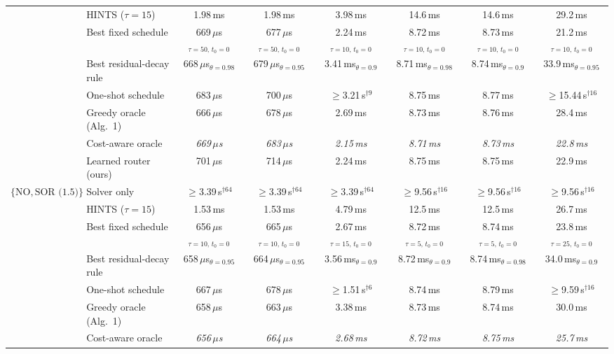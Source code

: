 {\begin{tabular}{llcccccc}
 & HINTS ($\tau{=}15$) & 1.98\,ms & 1.98\,ms & 3.98\,ms & 14.6\,ms & 14.6\,ms & 29.2\,ms \\
 & Best fixed schedule & 669\,$\mu$s$_{\tau{=}50,\,t_0{=}0}$ & 677\,$\mu$s$_{\tau{=}50,\,t_0{=}0}$ & 2.24\,ms$_{\tau{=}10,\,t_0{=}0}$ & 8.72\,ms$_{\tau{=}10,\,t_0{=}0}$ & 8.73\,ms$_{\tau{=}10,\,t_0{=}0}$ & 21.2\,ms$_{\tau{=}10,\,t_0{=}0}$ \\
 & Best residual-decay rule & 668\,$\mu$s$_{\theta{=}0.98}$ & 679\,$\mu$s$_{\theta{=}0.95}$ & 3.41\,ms$_{\theta{=}0.9}$ & 8.71\,ms$_{\theta{=}0.98}$ & 8.74\,ms$_{\theta{=}0.9}$ & 33.9\,ms$_{\theta{=}0.95}$ \\
 & One-shot schedule & 683\,$\mu$s & 700\,$\mu$s & $\geq$3.21\,s$^{\dagger 9}$ & 8.75\,ms & 8.77\,ms & $\geq$15.44\,s$^{\dagger 16}$ \\
 & Greedy oracle (Alg.~1) & 666\,$\mu$s & 678\,$\mu$s & 2.69\,ms & 8.73\,ms & 8.76\,ms & 28.4\,ms \\
 & Cost-aware oracle & \textit{669\,$\mu$s} & \textit{683\,$\mu$s} & \textit{2.15\,ms} & \textit{8.71\,ms} & \textit{8.73\,ms} & \textit{22.8\,ms} \\
 & Learned router (ours) & 701\,$\mu$s & 714\,$\mu$s & 2.24\,ms & 8.75\,ms & 8.75\,ms & 22.9\,ms \\
\midrule
$\{\mathrm{NO}, \text{SOR (1.5)}\}$ & Solver only & $\geq$3.39\,s$^{\dagger 64}$ & $\geq$3.39\,s$^{\dagger 64}$ & $\geq$3.39\,s$^{\dagger 64}$ & $\geq$9.56\,s$^{\dagger 16}$ & $\geq$9.56\,s$^{\dagger 16}$ & $\geq$9.56\,s$^{\dagger 16}$ \\
 & HINTS ($\tau{=}15$) & 1.53\,ms & 1.53\,ms & 4.79\,ms & 12.5\,ms & 12.5\,ms & 26.7\,ms \\
 & Best fixed schedule & 656\,$\mu$s$_{\tau{=}10,\,t_0{=}0}$ & 665\,$\mu$s$_{\tau{=}10,\,t_0{=}0}$ & 2.67\,ms$_{\tau{=}15,\,t_0{=}0}$ & 8.72\,ms$_{\tau{=}5,\,t_0{=}0}$ & 8.74\,ms$_{\tau{=}5,\,t_0{=}0}$ & 23.8\,ms$_{\tau{=}25,\,t_0{=}0}$ \\
 & Best residual-decay rule & 658\,$\mu$s$_{\theta{=}0.95}$ & 664\,$\mu$s$_{\theta{=}0.95}$ & 3.56\,ms$_{\theta{=}0.9}$ & 8.72\,ms$_{\theta{=}0.9}$ & 8.74\,ms$_{\theta{=}0.98}$ & 34.0\,ms$_{\theta{=}0.9}$ \\
 & One-shot schedule & 667\,$\mu$s & 678\,$\mu$s & $\geq$1.51\,s$^{\dagger 6}$ & 8.74\,ms & 8.79\,ms & $\geq$9.59\,s$^{\dagger 16}$ \\
 & Greedy oracle (Alg.~1) & 658\,$\mu$s & 663\,$\mu$s & 3.38\,ms & 8.73\,ms & 8.74\,ms & 30.0\,ms \\
 & Cost-aware oracle & \textit{656\,$\mu$s} & \textit{664\,$\mu$s} & \textit{2.68\,ms} & \textit{8.72\,ms} & \textit{8.75\,ms} & \textit{25.7\,ms} \\

\end{tabular}}

